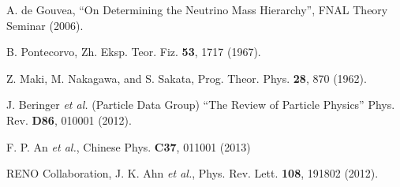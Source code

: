 %
%

 A. de Gouvea, ``On Determining the Neutrino Mass Hierarchy'', FNAL Theory Seminar (2006).

 B. Pontecorvo, Zh. Eksp. Teor. Fiz. {\bf 53}, 1717 (1967).

 Z. Maki, M. Nakagawa, and S. Sakata, Prog. Theor. Phys. {\bf 28}, 870 (1962).






 J. Beringer {\it et al.} (Particle Data Group) ``The Review of Particle Physics'' Phys. Rev. {\bf D86}, 010001 (2012).

 F. P. An {\it et al.}, 
Chinese Phys. \textbf{C37}, 011001 (2013)

 RENO Collaboration, J. K. Ahn {\it et al.},
Phys. Rev. Lett. {\bf 108}, 191802 (2012).








